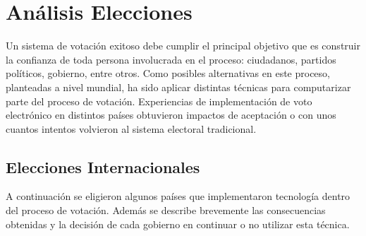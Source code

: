 \chapter{Análisis Elecciones}
\label{Elecciones}

Un sistema de votación exitoso debe cumplir el principal objetivo que es construir la confianza de toda persona involucrada en el proceso: ciudadanos, partidos políticos, gobierno, entre otros. Como posibles alternativas en este proceso, planteadas a nivel mundial, ha sido aplicar distintas técnicas para computarizar parte del proceso de votación. 
Experiencias de implementación de voto electrónico en distintos países obtuvieron impactos de aceptación o con unos cuantos intentos volvieron al sistema electoral tradicional.

\section{Elecciones Internacionales}
A continuación se eligieron algunos países que implementaron tecnología dentro del proceso de votación. Además se describe brevemente las consecuencias obtenidas y la decisión de cada gobierno en continuar o no utilizar esta técnica.

